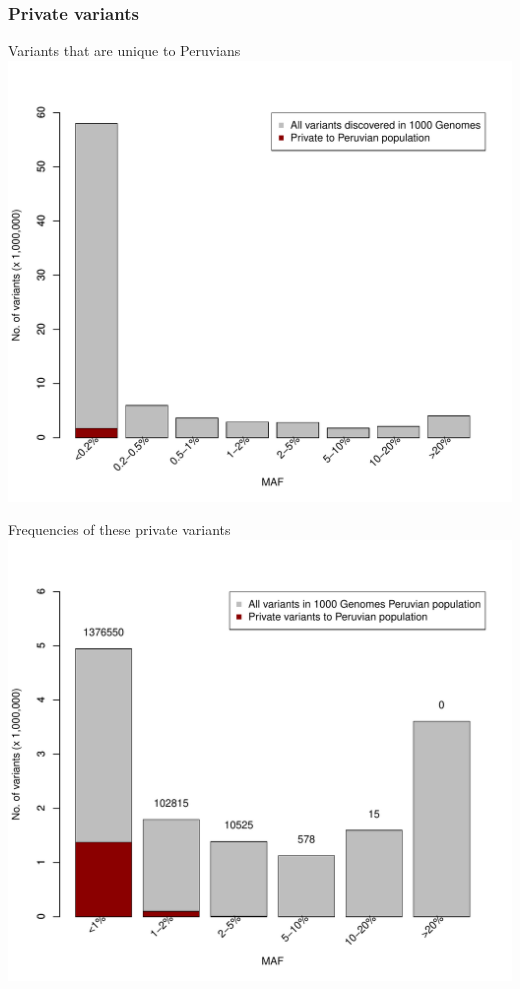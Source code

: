 \documentclass[11pt,xcolor=table]{beamer}
\begin{document}
\subsubsection{Private variants}
\begin{frame}{Variants that are unique to Peruvians}
\centering
\includegraphics[width=1\textwidth]{pics/all-frq-private-pel.pdf}
\end{frame}
\begin{frame}{Frequencies of these private variants}
\centering
\includegraphics[width=1\textwidth]{pics/pel-frq-private-pel.pdf}
\end{frame}
\end{document}
